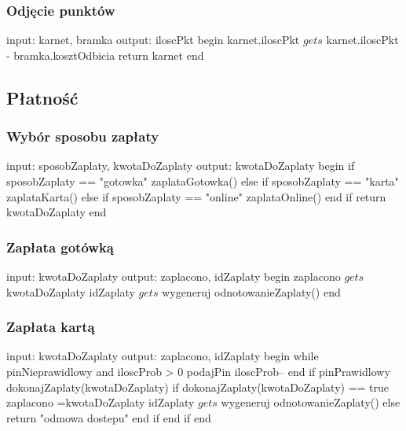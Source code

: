 \subsubsection{Odjęcie punktów}
\begin{algorithm}[caption={6.3 Odjęcie punktów}, label={alg1}]
  input: karnet, bramka
  output: iloscPkt
begin
  karnet.iloscPkt $gets$ karnet.iloscPkt - bramka.kosztOdbicia
  return karnet
end
\end{algorithm}

\subsection{Płatność}
\subsubsection{Wybór sposobu zapłaty}
\begin{algorithm}[caption={7.1 Wybór sposobu zapłaty}, label={alg1}]
  input: sposobZaplaty, kwotaDoZaplaty
  output: kwotaDoZaplaty
begin
  if sposobZaplaty == "gotowka" 
    zaplataGotowka() 
  else if sposobZaplaty == "karta" 
    zaplataKarta()
  else if sposobZaplaty == "online" 
    zaplataOnline()
  end if
  return kwotaDoZaplaty
end
\end{algorithm}

\subsubsection{Zapłata gotówką}
\begin{algorithm}[caption={7.2.1 Zapłata gotówką}, label={alg1}]
  input: kwotaDoZaplaty
  output: zaplacono, idZaplaty
begin
  zaplacono $gets$ kwotaDoZaplaty
  idZaplaty $gets$ wygeneruj
  odnotowanieZaplaty()
end
\end{algorithm}

\subsubsection{Zapłata kartą}
\begin{algorithm}[caption={7.3.1 Zapłata kartą}, label={alg1}]
input: kwotaDoZaplaty
  output: zaplacono, idZaplaty
begin
  while pinNieprawidlowy and iloscProb > 0
    podajPin
    iloscProb--
  end
  if pinPrawidlowy 
    dokonajZaplaty(kwotaDoZaplaty)
    if dokonajZaplaty(kwotaDoZaplaty) == true 
      zaplacono =kwotaDoZaplaty
      idZaplaty $gets$ wygeneruj
      odnotowanieZaplaty()
    else
      return "odmowa dostepu"
    end if
  end if
end
\end{algorithm}

